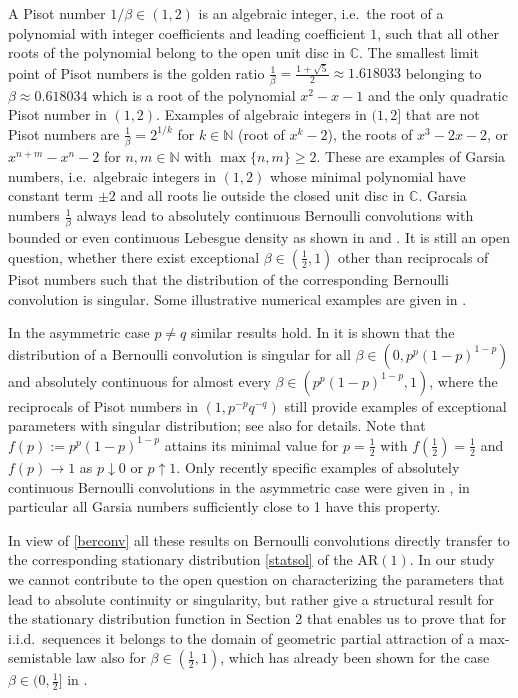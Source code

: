 \documentclass[12pt]{amsart}
\theoremstyle{definition}
\theoremstyle{remark}
\newcommand{\nat}{{\mathbb N}}
\newcommand{\complex}{{\mathbb C}}
\newcommand{\AR}{\operatorname{AR(1)}}
\numberwithin{equation}{section}
\begin{document}
A Pisot number $1/\beta\in(1,2)$ is an algebraic integer, i.e.\ the root of a polynomial with integer coefficients and leading coefficient $1$, such that all other roots of the polynomial belong to the open unit disc in $\complex$. 
The smallest limit point of Pisot numbers is the golden ratio $\frac1{\beta}=\frac{1+\sqrt{5}}{2}\approx 1.618033$ belonging to $\beta\approx 0.618034$ which is a root of the polynomial $x^2-x-1$ and the only quadratic Pisot number in $(1,2)$. Examples of algebraic integers in $(1,2]$ that are not Pisot numbers are $\frac1{\beta}=2^{1/k}$ for $k\in\mathbb N$ (root of $x^{k}-2$), the roots of $x^3-2x-2$, or $x^{n+m}-x^n-2$ for $n,m\in\nat$ with $\max\{n,m\}\geq2$. These are examples of Garsia numbers, i.e.\ algebraic integers in $(1,2)$ whose minimal polynomial have constant term $\pm2$ and all roots lie outside the closed unit disc in $\mathbb C$. Garsia numbers $\frac1{\beta}$ always lead to absolutely continuous Bernoulli convolutions with bounded or even continuous Lebesgue density as shown in \cite{Gar} and \cite{Yu}.
It is still an open question, whether there exist exceptional $\beta\in(\frac12,1)$ other than reciprocals of Pisot numbers such that the distribution of the corresponding Bernoulli convolution is singular. Some illustrative numerical examples are given in \cite{Sol2}. 

In the asymmetric case $p\not=q$ similar results hold. In \cite{PerSol2} it is shown that the distribution of a Bernoulli convolution is singular for all $\beta\in(0,p^{p}(1-p)^{1-p})$ and absolutely continuous for almost every $\beta\in(p^{p}(1-p)^{1-p},1)$, where the reciprocals of Pisot numbers in $(1,p^{-p}q^{-q})$ still provide examples of exceptional parameters with singular distribution; see also \cite{PerSch} for details. Note that $f(p):=p^{p}(1-p)^{1-p}$ attains its minimal value for $p=\frac12$ with $f(\frac12)=\frac12$ and $f(p)\to1$ as $p\downarrow0$ or $p\uparrow 1$. Only recently specific examples of absolutely continuous Bernoulli convolutions in the asymmetric case were given in \cite{Varju2}, in particular all Garsia numbers sufficiently close to 1 have this property.

In view of \eqref{berconv} all these results on Bernoulli convolutions directly transfer to the corresponding stationary distribution \eqref{statsol} of the $\AR$. In our study we cannot contribute to the open question on characterizing the parameters that lead to absolute continuity or singularity, but rather give a structural result for the stationary distribution function in Section 2 that enables us to prove that for i.i.d.\ sequences it belongs to the domain of geometric partial attraction of a max-semistable law also for $\beta\in(\frac12,1)$, which has already been shown for the case $\beta\in(0,\frac12]$ in \cite{Sterk}.
\end{document}
